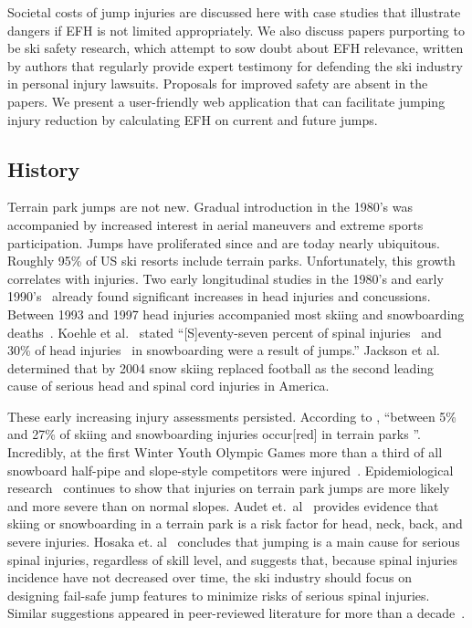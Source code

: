 \documentclass[smallextended]{svjour3}       %
\begin{document}
Societal costs of jump injuries are discussed here with case studies that
illustrate dangers if EFH is not limited appropriately. We also discuss papers
purporting to be ski safety research, which attempt to sow doubt about EFH
relevance, written by authors that regularly provide expert testimony for
defending the ski industry in personal injury lawsuits. Proposals for improved
safety are absent in the papers. We present a user-friendly web application
that can facilitate jumping injury reduction by calculating EFH on current and
future jumps.

\subsection{History}
\label{sec:hist}
%
Terrain park jumps are not new. Gradual introduction in the 1980's was
accompanied by increased interest in aerial maneuvers and extreme sports
participation. Jumps have proliferated since and are today nearly ubiquitous.
Roughly 95\% of US ski resorts include terrain parks. Unfortunately, this
growth correlates with injuries. Two early longitudinal studies in the 1980's
and early 1990's~\cite{Deibert1998,Furrer1995} already found significant
increases in head injuries and concussions. Between 1993 and 1997 head injuries
accompanied most skiing and snowboarding deaths~\cite{CPSC1999}. Koehle et
al.~\cite{Koehle2002} stated ``[S]eventy-seven percent of spinal
injuries~\cite{Tarazi1999} and 30\% of head injuries~\cite{Fukuda2001} in
snowboarding were a result of jumps.'' Jackson et al.~\cite{Jackson2004}
determined that by 2004 snow skiing replaced football as the second leading
cause of serious head and spinal cord injuries in America.

These early increasing injury assessments persisted. According to
\cite{Russell2014}, ``between 5\% and 27\% of skiing and snowboarding injuries
occur[red] in terrain parks
\cite{Bridges2003,Goulet2007,Moffat2009,Greve2009,Brooks2010,Ruedl2013}''.
Incredibly, at the first Winter Youth Olympic Games more than a third of all
snowboard half-pipe and slope-style competitors were injured~\cite{Ruedl2012}.
Epidemiological research~\cite{Carus2016,Audet2020,Hosaka2020} continues to
show that injuries on terrain park jumps are more likely and more severe than
on normal slopes. Audet et.~al~\cite{Audet2020} provides evidence that skiing
or snowboarding in a terrain park is a risk factor for head, neck, back, and
severe injuries. Hosaka et. al~\cite{Hosaka2020} concludes that jumping is a
main cause for serious spinal injuries, regardless of skill level, and suggests
that, because spinal injuries incidence  have not decreased over time,  the ski
industry should focus on designing fail-safe jump features to minimize risks of
serious spinal injuries. Similar suggestions appeared in peer-reviewed
literature for more than a
decade~\cite{Hubbard2009,Swedberg2012,McNeil2012,McNeil2012a,Hubbard2015,Levy2015,Petrone2017,Moore2018}.
\end{document}

